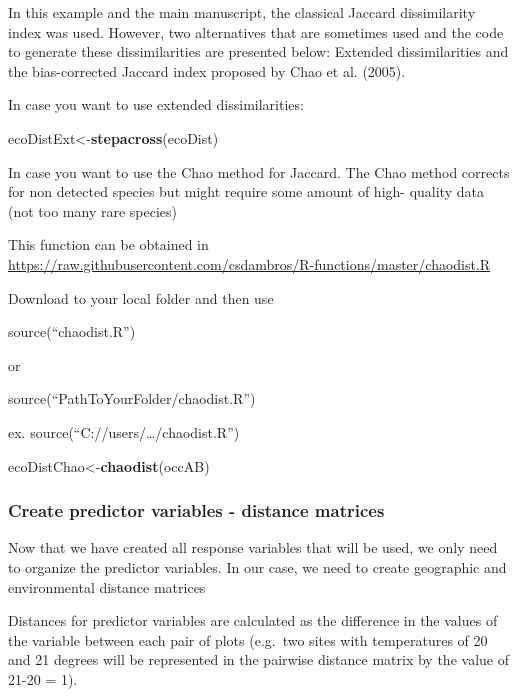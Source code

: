\documentclass[]{article}
\newenvironment{Shaded}{\begin{snugshade}}{\end{snugshade}}
\newcommand{\KeywordTok}[1]{\textcolor[rgb]{0.13,0.29,0.53}{\textbf{#1}}}
\newcommand{\NormalTok}[1]{#1}
\begin{document}
In this example and the main manuscript, the classical Jaccard
dissimilarity index was used. However, two alternatives that are
sometimes used and the code to generate these dissimilarities are
presented below: Extended dissimilarities and the bias-corrected Jaccard
index proposed by Chao et al. (2005).

In case you want to use extended dissimilarities:

\begin{Shaded}
\begin{Highlighting}[]
\NormalTok{ecoDistExt<-}\KeywordTok{stepacross}\NormalTok{(ecoDist)}
\end{Highlighting}
\end{Shaded}

In case you want to use the Chao method for Jaccard. The Chao method
corrects for non detected species but might require some amount of high-
quality data (not too many rare species)

This function can be obtained in
\url{https://raw.githubusercontent.com/csdambros/R-functions/master/chaodist.R}

Download to your local folder and then use

source(``chaodist.R'')

or

source(``PathToYourFolder/chaodist.R'')

ex. source(``C://users/\ldots{}/chaodist.R'')

\begin{Shaded}
\begin{Highlighting}[]
\NormalTok{ecoDistChao<-}\KeywordTok{chaodist}\NormalTok{(occAB)}
\end{Highlighting}
\end{Shaded}

\hypertarget{create-predictor-variables---distance-matrices}{%
\subsubsection{Create predictor variables - distance
matrices}\label{create-predictor-variables---distance-matrices}}

Now that we have created all response variables that will be used, we
only need to organize the predictor variables. In our case, we need to
create geographic and environmental distance matrices

Distances for predictor variables are calculated as the difference in
the values of the variable between each pair of plots (e.g.~two sites
with temperatures of 20 and 21 degrees will be represented in the
pairwise distance matrix by the value of 21-20 = 1).
\end{document}
